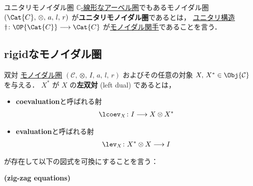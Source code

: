\documentclass[TQFT_main]{subfiles}
\begin{document}
\begin{mydef}[label=reredef:unitary-monoidal]{ユニタリモノイダル圏}
    \hyperref[def:additive-cat]{$\mathbb{C}$-線形なアーベル圏}でもあるモノイダル圏 $(\Cat{C},\, \otimes ,\, a,\, l,\, r)$ が\textbf{ユニタリモノイダル圏}であるとは，
    \hyperref[redef:unitary]{ユニタリ構造} $\dagger \colon \OP{\Cat{C}} \lto \Cat{C}$ が\hyperref[redef:monidal-functor]{モノイダル関手}であることを言う．
\end{mydef}

\subsection{rigidなモノイダル圏}

\begin{mydef}[label=redef:dual,breakable]{双対}
    \hyperref[def:monoidal-category]{モノイダル圏} $(\mathcal{C},\, \otimes,\, I,\, a,\, l,\, r)$ およびその任意の対象 $X,\, X^* \in \Obj{\mathcal{C}}$ を与える．
    $X^*$ が $X$ の\textbf{左双対} (left dual) であるとは，
    \begin{itemize}
        \item \textbf{coevaluation}と呼ばれる射
        \begin{align}
            \lcoev_X \colon I \lto X \otimes X^*
        \end{align}
        \item \textbf{evaluation}と呼ばれる射
        \begin{align}
            \lev_X \colon X^* \otimes X \lto I
        \end{align}
    \end{itemize}
    が存在して以下の図式を可換にすることを言う：
    \begin{description}
        \item[\textbf{(zig-zag equations)}]　
        
        \begin{center}
        \end{center}


\end{description}
\end{mydef}
\end{document}
